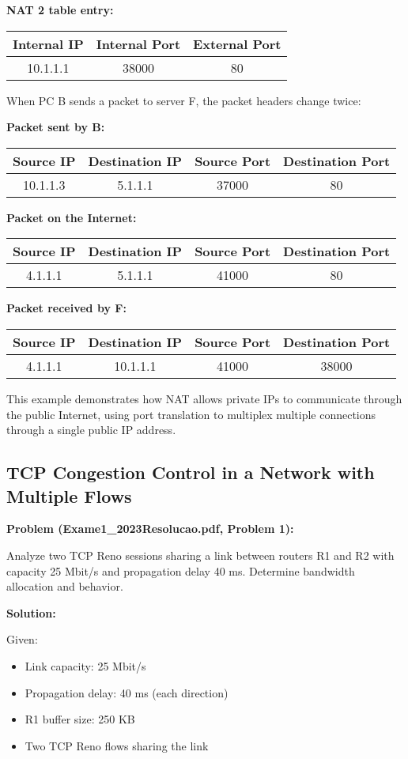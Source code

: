 \documentclass[11pt,a4paper]{article}
\begin{document}
\textbf{NAT 2 table entry:}
\begin{tabular}{|c|c|c|}
\hline
Internal IP & Internal Port & External Port \\
\hline
10.1.1.1 & 38000 & 80 \\
\hline
\end{tabular}

When PC B sends a packet to server F, the packet headers change twice:

\textbf{Packet sent by B:}
\begin{tabular}{|c|c|c|c|}
\hline
Source IP & Destination IP & Source Port & Destination Port \\
\hline
10.1.1.3 & 5.1.1.1 & 37000 & 80 \\
\hline
\end{tabular}

\textbf{Packet on the Internet:}
\begin{tabular}{|c|c|c|c|}
\hline
Source IP & Destination IP & Source Port & Destination Port \\
\hline
4.1.1.1 & 5.1.1.1 & 41000 & 80 \\
\hline
\end{tabular}

\textbf{Packet received by F:}
\begin{tabular}{|c|c|c|c|}
\hline
Source IP & Destination IP & Source Port & Destination Port \\
\hline
4.1.1.1 & 10.1.1.1 & 41000 & 38000 \\
\hline
\end{tabular}

This example demonstrates how NAT allows private IPs to communicate through the public Internet, using port translation to multiplex multiple connections through a single public IP address.

\subsection{TCP Congestion Control in a Network with Multiple Flows}
\textbf{Problem (Exame1\_2023Resolucao.pdf, Problem 1):}

Analyze two TCP Reno sessions sharing a link between routers R1 and R2 with capacity 25 Mbit/s and propagation delay 40 ms. Determine bandwidth allocation and behavior.

\textbf{Solution:}

Given:
\begin{itemize}
    \item Link capacity: 25 Mbit/s
    \item Propagation delay: 40 ms (each direction)
    \item R1 buffer size: 250 KB
    \item Two TCP Reno flows sharing the link
\end{itemize}
\end{document}
